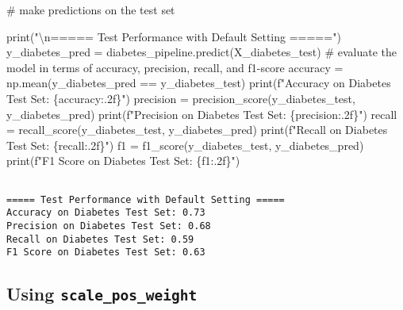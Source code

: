\documentclass[
  letterpaper,
  DIV=11,
  numbers=noendperiod]{scrreprt}
\newenvironment{Shaded}{\begin{snugshade}}{\end{snugshade}}
\newcommand{\BuiltInTok}[1]{\textcolor[rgb]{0.00,0.23,0.31}{#1}}
\newcommand{\CharTok}[1]{\textcolor[rgb]{0.13,0.47,0.30}{#1}}
\newcommand{\CommentTok}[1]{\textcolor[rgb]{0.37,0.37,0.37}{#1}}
\newcommand{\NormalTok}[1]{\textcolor[rgb]{0.00,0.23,0.31}{#1}}
\newcommand{\OperatorTok}[1]{\textcolor[rgb]{0.37,0.37,0.37}{#1}}
\newcommand{\SpecialCharTok}[1]{\textcolor[rgb]{0.37,0.37,0.37}{#1}}
\newcommand{\SpecialStringTok}[1]{\textcolor[rgb]{0.13,0.47,0.30}{#1}}
\newcommand{\StringTok}[1]{\textcolor[rgb]{0.13,0.47,0.30}{#1}}
\begin{document}
\begin{Shaded}
\begin{Highlighting}[]
\CommentTok{\# make predictions on the test set}

\BuiltInTok{print}\NormalTok{(}\StringTok{"}\CharTok{\textbackslash{}n}\StringTok{===== Test Performance with Default Setting ====="}\NormalTok{)}
\NormalTok{y\_diabetes\_pred }\OperatorTok{=}\NormalTok{ diabetes\_pipeline.predict(X\_diabetes\_test)}
\CommentTok{\# evaluate the model in terms of accuracy, precision, recall, and f1{-}score}
\NormalTok{accuracy }\OperatorTok{=}\NormalTok{ np.mean(y\_diabetes\_pred }\OperatorTok{==}\NormalTok{ y\_diabetes\_test)}
\BuiltInTok{print}\NormalTok{(}\SpecialStringTok{f"Accuracy on Diabetes Test Set: }\SpecialCharTok{\{}\NormalTok{accuracy}\SpecialCharTok{:.2f\}}\SpecialStringTok{"}\NormalTok{)}
\NormalTok{precision }\OperatorTok{=}\NormalTok{ precision\_score(y\_diabetes\_test, y\_diabetes\_pred)}
\BuiltInTok{print}\NormalTok{(}\SpecialStringTok{f"Precision on Diabetes Test Set: }\SpecialCharTok{\{}\NormalTok{precision}\SpecialCharTok{:.2f\}}\SpecialStringTok{"}\NormalTok{)}
\NormalTok{recall }\OperatorTok{=}\NormalTok{ recall\_score(y\_diabetes\_test, y\_diabetes\_pred)}
\BuiltInTok{print}\NormalTok{(}\SpecialStringTok{f"Recall on Diabetes Test Set: }\SpecialCharTok{\{}\NormalTok{recall}\SpecialCharTok{:.2f\}}\SpecialStringTok{"}\NormalTok{)}
\NormalTok{f1 }\OperatorTok{=}\NormalTok{ f1\_score(y\_diabetes\_test, y\_diabetes\_pred)}
\BuiltInTok{print}\NormalTok{(}\SpecialStringTok{f"F1 Score on Diabetes Test Set: }\SpecialCharTok{\{}\NormalTok{f1}\SpecialCharTok{:.2f\}}\SpecialStringTok{"}\NormalTok{)}
\end{Highlighting}
\end{Shaded}

\begin{verbatim}

===== Test Performance with Default Setting =====
Accuracy on Diabetes Test Set: 0.73
Precision on Diabetes Test Set: 0.68
Recall on Diabetes Test Set: 0.59
F1 Score on Diabetes Test Set: 0.63
\end{verbatim}

\subsection{\texorpdfstring{Using
\texttt{scale\_pos\_weight}}{Using scale\_pos\_weight}}\label{using-scale_pos_weight}
\end{document}
